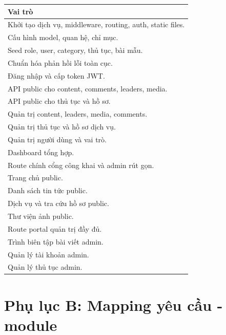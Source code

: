 \documentclass[12pt,a4paper]{article}
\begin{document}
\renewcommand{\arraystretch}{1.25}

\begin{longtable}{p{14cm}}
	\toprule
	\textbf{Vai trò} \\
	\midrule
	Khởi tạo dịch vụ, middleware, routing, auth, static files. \\
	Cấu hình model, quan hệ, chỉ mục. \\
	Seed role, user, category, thủ tục, bài mẫu. \\
	Chuẩn hóa phản hồi lỗi toàn cục. \\
	Đăng nhập và cấp token JWT. \\
	API public cho content, comments, leaders, media. \\
	API public cho thủ tục và hồ sơ. \\
	Quản trị content, leaders, media, comments. \\
	Quản trị thủ tục và hồ sơ dịch vụ. \\
	Quản trị người dùng và vai trò. \\
	Dashboard tổng hợp. \\
	Route chính cổng công khai và admin rút gọn. \\
	Trang chủ public. \\
	Danh sách tin tức public. \\
	Dịch vụ và tra cứu hồ sơ public. \\
	Thư viện ảnh public. \\
	Route portal quản trị đầy đủ. \\
	Trình biên tập bài viết admin. \\
	Quản lý tài khoản admin. \\
	Quản lý thủ tục admin. \\
	\bottomrule
\end{longtable}

\section*{Phụ lục B: Mapping yêu cầu - module}
\end{document}
